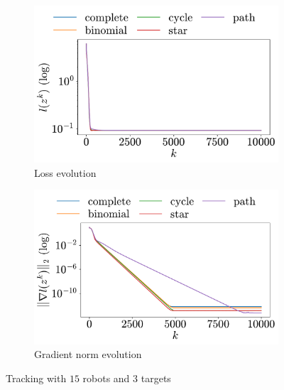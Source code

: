 \documentclass[a4paper,11pt,oneside]{book}
\begin{document}
\begin{figure}[h!]
      \centering
      \begin{subfigure}[h]{0.4\linewidth}
            \centering
            \includegraphics[width=\linewidth]{./figs/tracking/15_3_2/loss.pdf} 
            \caption{Loss evolution}
      \end{subfigure}
      \hfill
      \begin{subfigure}[h]{0.4\linewidth}
            \centering
            \includegraphics[width=\linewidth]{./figs/tracking/15_3_2/gradient.pdf} 
            \caption{Gradient norm evolution}
      \end{subfigure}
      \caption{Tracking with $15$ robots and $3$ targets}
      \label{fig:tracking_15_3}
\end{figure}
\end{document}
